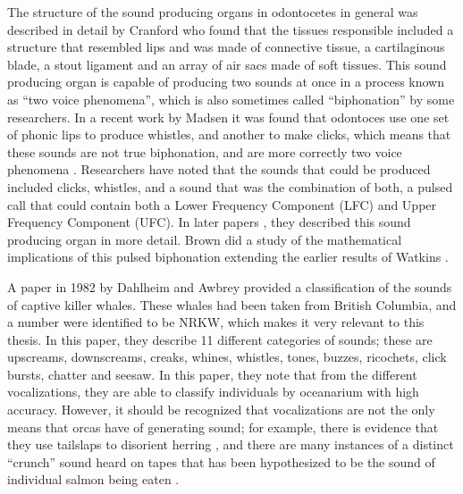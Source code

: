\documentclass[12pt,oneside]{book}
\begin{document}
The structure of the sound producing organs in odontocetes in general
was described in detail by Cranford \cite{cranford1996morphology} who
found that the tissues responsible included a structure that resembled
lips and was made of connective tissue, a cartilaginous blade, a stout
ligament and an array of air sacs made of soft tissues.  This sound
producing organ is capable of producing two sounds at once in a
process known as ``two voice phenomena'', which is also sometimes
called ``biphonation'' by some researchers.  In a recent work by
Madsen \cite{madsen2013nasal} it was found that odontoces use one set
of phonic lips to produce whistles, and another to make clicks, which
means that these sounds are not true biphonation, and are more
correctly two voice phenomena \cite{wilden1998subharmonics}.
Researchers have noted that the sounds that could be produced included
clicks, whistles, and a sound that was the combination of both, a
pulsed call that could contain both a Lower Frequency Component (LFC)
and Upper Frequency Component (UFC).  In later papers
\cite{cranford2000impulse} \cite{cranford2006nasalizations}, they
described this sound producing organ in more detail.  Brown
\cite{brown2008math} did a study of the mathematical implications of
this pulsed biphonation extending the earlier results of Watkins
\cite{watkins1967harmonic}.

A paper in 1982 by Dahlheim and Awbrey
\cite{dahlheim1982classification} provided a classification of the
sounds of captive killer whales.  These whales had been taken from
British Columbia, and a number were identified to be NRKW, which makes it very relevant to this thesis.  In
this paper, they describe 11 different categories of sounds; these are
upscreams, downscreams, creaks, whines, whistles, tones, buzzes,
ricochets, click bursts, chatter and seesaw.  In this paper, they note
that from the different vocalizations, they are able to classify
individuals by oceanarium with high accuracy.  However, it should be
recognized that vocalizations are not the only means that orcas have
of generating sound; for example, there is evidence that they use
tailslaps to disorient herring \cite{simon2005tailslap}, and there are
many instances of a distinct ``crunch'' sound heard on tapes that has
been hypothesized to be the sound of individual salmon being eaten
\cite{helena2012interview}.
\end{document}
